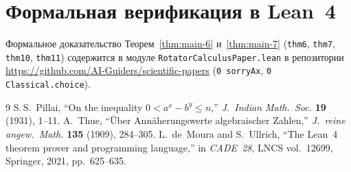 \documentclass[11pt,a4paper]{article}
\theoremstyle{plain}
\theoremstyle{definition}
\begin{document}
\section{Формальная верификация в Lean~4}
Формальное доказательство Теорем~\ref{thm:main-6} и~\ref{thm:main-7} (\texttt{thm6}, \texttt{thm7}, \texttt{thm10}, \texttt{thm11}) содержится в модуле \texttt{RotatorCalculusPaper.lean} в репозитории \url{https://github.com/AI-Guiders/scientific-papers} (\texttt{0 sorryAx}, \texttt{0 Classical.choice}).

\begin{thebibliography}{9}
S.\,S.~Pillai, ``On the inequality $0 < a^x - b^y \le n$,'' \emph{J.~Indian Math.~Soc.} \textbf{19} (1931), 1--11.
A.~Thue, ``\"Uber Ann\"aherungswerte algebraischer Zahlen,'' \emph{J.~reine angew.~Math.} \textbf{135} (1909), 284--305.
L.~de~Moura and S.~Ullrich, ``The Lean~4 theorem prover and programming language,'' in \emph{CADE~28}, LNCS vol.~12699, Springer, 2021, pp.~625--635.
\end{thebibliography}
\end{document}
